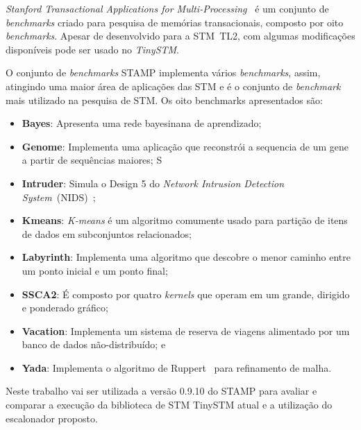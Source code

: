 \documentclass[diss,capa]{texufpel}
\begin{document}
\emph{Stanford Transactional Applications for Multi-Processing}~\cite{STAMP} é um conjunto de \emph{benchmarks} criado para pesquisa de memórias transacionais, composto por oito \emph{benchmarks}. Apesar de desenvolvido para a STM~TL2, com algumas modificações disponíveis pode ser usado no \emph{TinySTM}.


O conjunto de \emph{benchmarks} STAMP implementa vários \emph{benchmarks}, assim, atingindo uma maior área de aplicações das STM e é o conjunto de \emph{benchmark} mais utilizado na pesquisa de STM. Os oito benchmarks apresentados são:

\begin{itemize}
  \item \textbf{Bayes}: Apresenta uma rede bayesinana de aprendizado;
  \item \textbf{Genome}: Implementa uma aplicação que reconstrói a sequencia de um gene a partir de sequências maiores;
  S\item \textbf{Intruder}: Simula o Design 5 do \emph{Network Intrusion Detection System}~(NIDS)~\cite{Haagdorens05};
  \item \textbf{Kmeans}:  \emph{K-means} é um algoritmo comumente usado para partição de itens de dados em subconjuntos relacionados;
  \item \textbf{Labyrinth}: Implementa uma algoritmo que descobre o menor caminho entre um ponto inicial e um ponto final;
  \item \textbf{SSCA2}: É composto por quatro \emph{kernels} que operam em um grande, dirigido e ponderado gráfico;
  \item \textbf{Vacation}: Implementa um sistema de reserva de viagens alimentado por um banco de dados não-distribuído; e
  \item \textbf{Yada}: Implementa o algoritmo de Ruppert~\cite{Ruppert95} para refinamento de malha.
\end{itemize}

Neste trabalho vai ser utilizada a versão 0.9.10 do STAMP para avaliar e comparar a execução da biblioteca de STM TinySTM atual e a utilização do escalonador proposto.

\end{document}
